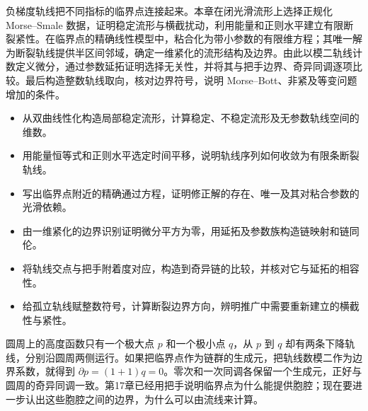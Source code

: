 
% 
% 


\begin{chapterabstract}
	负梯度轨线把不同指标的临界点连接起来。本章在闭光滑流形上选择正规化 Morse--Smale 数据，证明稳定流形与横截扰动，利用能量和正则水平建立有限断裂紧性。在临界点的精确线性模型中，粘合化为带小参数的有限维方程；其唯一解为断裂轨线提供半区间邻域，确定一维紧化的流形结构及边界。由此以模二轨线计数定义微分，通过参数延拓证明选择无关性，并将其与把手边界、奇异同调逐项比较。最后构造整数轨线取向，核对边界符号，说明 Morse--Bott、非紧及等变问题增加的条件。
\end{chapterabstract}

\begin{learninggoals}
	\begin{itemize}
		\item 从双曲线性化构造局部稳定流形，计算稳定、不稳定流形及无参数轨线空间的维数。
		\item 用能量恒等式和正则水平选定时间平移，说明轨线序列如何收敛为有限条断裂轨线。
		\item 写出临界点附近的精确通过方程，证明修正解的存在、唯一及其对粘合参数的光滑依赖。
		\item 由一维紧化的边界识别证明微分平方为零，用延拓及参数族构造链映射和链同伦。
		\item 将轨线交点与把手附着度对应，构造到奇异链的比较，并核对它与延拓的相容性。
		\item 给孤立轨线赋整数符号，计算断裂边界方向，辨明推广中需要重新建立的横截性与紧性。
	\end{itemize}
\end{learninggoals}

圆周上的高度函数只有一个极大点 \(p\) 和一个极小点 \(q\)，从 \(p\) 到 \(q\) 却有两条下降轨线，分别沿圆周两侧运行。如果把临界点作为链群的生成元，把轨线数模二作为边界系数，就得到 \(\partial p=(1+1)q=0\)。零次和一次同调各保留一个生成元，正好与圆周的奇异同调一致。第17章已经用把手说明临界点为什么能提供胞腔；现在要进一步认出这些胞腔之间的边界，为什么可以由流线来计算。

\ProseParagraphBreak


